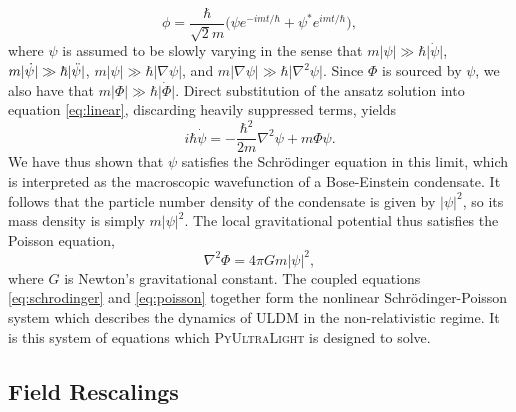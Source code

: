 \documentclass[a4paper,11pt]{article}
\newcommand{\PyUltraLight}{\textsc{PyUltraLight}\xspace}
\begin{document}
\begin{equation}\label{eq:ansatz}
    \phi=\frac{\hbar}{\sqrt{2}m}\big(\psi e^{-imt/\hbar}+\psi^* e^{imt/\hbar}\big),
\end{equation}
where $\psi$ is assumed to be slowly varying in the sense that $m\vert\psi\vert\gg\hbar\vert\dot{\psi}\vert$, $m\vert\dot{\psi}\vert\gg\hbar\vert\Ddot{\psi}\vert$, $m\vert\psi\vert\gg\hbar\vert\nabla{\psi}\vert$, and $m\vert\nabla{\psi}\vert\gg\hbar\vert\nabla^2{\psi}\vert$. Since $\Phi$ is sourced by $\psi$, we also have that $m\vert\Phi\vert\gg\hbar\vert\dot{\Phi}\vert$. Direct substitution of the ansatz solution into equation \ref{eq:linear}, discarding heavily suppressed terms, yields
\begin{equation}\label{eq:schrodinger}
    i\hbar\Dot{\psi}=-\frac{\hbar^2}{2m}\nabla^2\psi+m\Phi\psi.
\end{equation}
We have thus shown that $\psi$ satisfies the Schr{\"o}dinger equation in this limit, which is interpreted as the macroscopic wavefunction of a Bose-Einstein condensate. It follows that the particle number density of the condensate is given by $\vert\psi\vert^2$, so its mass density is simply $m\vert\psi\vert^2$. The local gravitational potential thus satisfies the Poisson equation,
\begin{equation}\label{eq:poisson}
    \nabla^2\Phi=4\pi G m \vert\psi\vert^2,
\end{equation}
where $G$ is Newton's gravitational constant. The coupled equations \ref{eq:schrodinger} and \ref{eq:poisson} together form the nonlinear Schr{\"o}dinger-Poisson system which describes the dynamics of ULDM in the non-relativistic regime. It is this system of equations which \PyUltraLight is designed to solve. 


\subsection{Field Rescalings}
\end{document}
